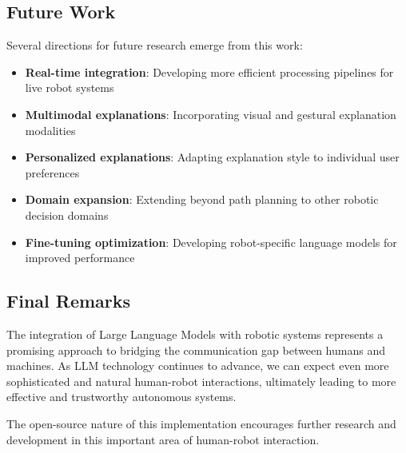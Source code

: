 \subsection{Future Work}
Several directions for future research emerge from this work:
\begin{itemize}
    \item \textbf{Real-time integration}: Developing more efficient processing pipelines for live robot systems
    \item \textbf{Multimodal explanations}: Incorporating visual and gestural explanation modalities
    \item \textbf{Personalized explanations}: Adapting explanation style to individual user preferences
    \item \textbf{Domain expansion}: Extending beyond path planning to other robotic decision domains
    \item \textbf{Fine-tuning optimization}: Developing robot-specific language models for improved performance
\end{itemize}

\subsection{Final Remarks}

The integration of Large Language Models with robotic systems represents a promising approach to bridging the communication gap between humans and machines. As LLM technology continues to advance, we can expect even more sophisticated and natural human-robot interactions, ultimately leading to more effective and trustworthy autonomous systems.

The open-source nature of this implementation encourages further research and development in this important area of human-robot interaction.
